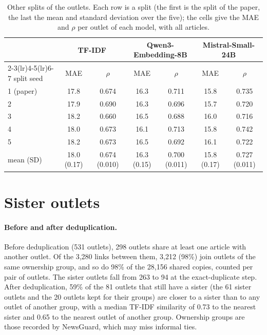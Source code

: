 \documentclass[11pt,a4paper]{article}
\begin{document}
\begin{table}[h]
\centering
\caption{Other splits of the outlets. Each row is a split (the first is the split of the paper, the last the mean and
standard deviation over the five); the cells give the MAE and $\rho$ per outlet of each model, with all
articles.}\label{tab:splits}
\small\setlength{\tabcolsep}{4pt}
\begin{tabular}{lcccccc}
\toprule
& \multicolumn{2}{c}{TF-IDF} & \multicolumn{2}{c}{Qwen3-Embedding-8B} & \multicolumn{2}{c}{Mistral-Small-24B} \\
\cmidrule(lr){2-3}\cmidrule(lr){4-5}\cmidrule(lr){6-7}
split seed & MAE & $\rho$ & MAE & $\rho$ & MAE & $\rho$ \\
\midrule
1 (paper) & 17.8 & 0.674 & 16.3 & 0.711 & 15.8 & 0.735 \\
2 & 17.9 & 0.690 & 16.3 & 0.696 & 15.7 & 0.720 \\
3 & 18.2 & 0.660 & 16.5 & 0.688 & 16.0 & 0.716 \\
4 & 18.0 & 0.673 & 16.1 & 0.713 & 15.8 & 0.742 \\
5 & 18.2 & 0.673 & 16.5 & 0.692 & 16.1 & 0.722 \\
\midrule
mean (SD) & 18.0 (0.17) & 0.674 (0.010) & 16.3 (0.15) & 0.700 (0.011) & 15.8 (0.17) & 0.727 (0.011) \\
\bottomrule
\end{tabular}
\end{table}

\section{Sister outlets}\label{app:sisters}
\paragraph{Before and after deduplication.} Before deduplication (531 outlets), 298 outlets share at least one article
with another outlet. Of the 3,280 links between them, 3,212 (98\%) join outlets of the same ownership group, and so do
98\% of the 28,156 shared copies, counted per pair of outlets. The sister outlets fall from 263 to 94 at the
exact-duplicate step. After deduplication, 59\% of the 81 outlets that still have a sister (the 61 sister outlets and
the 20 outlets kept for their groups) are closer to a sister than to any outlet of another group, with a median TF-IDF
similarity of 0.73 to the nearest sister and 0.65 to the nearest outlet of another group. Ownership groups are those
recorded by NewsGuard, which may miss informal ties.
\end{document}
